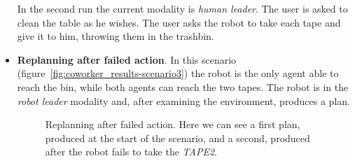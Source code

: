 \begin{itemize}
In the second run the current modality is \textit{human leader}. The user is
asked to clean the table as he wishes. The user asks the robot to take
each tape and give it to him, throwing them in the trashbin.

\item
\textbf{Replanning after failed action}. 
In this scenario (figure~\ref{fig:coworker_results-scenario3}) the robot is the only agent able to reach the
bin, while both agents can reach the two tapes. The
robot is in the \textit{robot leader} modality and, after examining the
environment, produces a plan.

\begin{figure}
  \caption[Robot coworker experiment 3]{Replanning after failed action. Here we can see a first
    plan, produced at the start of the scenario, and a second,
    produced after the robot fails to take the \textit{TAPE2}. }
  \centering
\end{figure}
\end{itemize}
